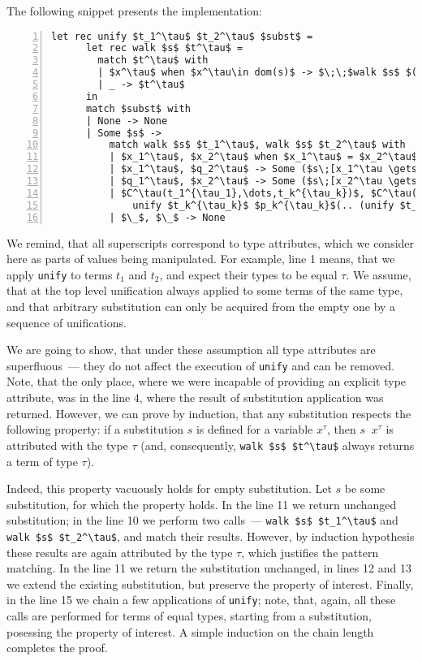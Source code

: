 The following snippet presents the implementation:

\begin{lstlisting}[mathescape=true,numbers=left,numberstyle=\small,stepnumber=1,numbersep=-5pt]
    let rec unify $t_1^\tau$ $t_2^\tau$ $subst$ = 
      let rec walk $s$ $t^\tau$ = 
        match $t^\tau$ with
        | $x^\tau$ when $x^\tau\in dom(s)$ -> $\;\;$walk $s$ $(s\;\;x^\tau)$
        | _ -> $t^\tau$
      in
      match $subst$ with
      | None -> None
      | Some $s$ ->
          match walk $s$ $t_1^\tau$, walk $s$ $t_2^\tau$ with
          | $x_1^\tau$, $x_2^\tau$ when $x_1^\tau$ = $x_2^\tau$ -> $subst$
          | $x_1^\tau$, $q_2^\tau$ -> Some ($s\;[x_1^\tau \gets q_2^\tau]$)
          | $q_1^\tau$, $x_2^\tau$ -> Some ($s\;[x_2^\tau \gets q_1^\tau]$)
          | $C^\tau(t_1^{\tau_1},\dots,t_k^{\tau_k})$, $C^\tau(p_1^{\tau_1},\dots,p_k^{\tau_k})$ -> 
              unify $t_k^{\tau_k}$ $p_k^{\tau_k}$(.. (unify $t_1^{\tau_1}$ $p_1^{\tau_1}$ $subst$)$..$)
          | $\_$, $\_$ -> None
\end{lstlisting}

We remind, that all superscripts correspond to type attributes, which we consider here as 
parts of values being manipulated. For example, line 1 means, that we apply \lstinline{unify}
to terms $t_1$ and $t_2$, and expect their types to be equal $\tau$. We assume, that 
at the top level unification always applied to some terms of the same type, and that arbitrary
substitution can only be acquired from the empty one by a sequence of unifications.

We are going to show, that under these assumption all type attributes are superfluous~--- they
do not affect the execution of \lstinline{unify} and can be removed. Note, that the only place, where we
were incapable of providing an explicit type attribute, was in the line 4, where the result of
substitution application was returned. However, we can prove by induction, that any substitution 
respects the following property: if a substitution $s$ is defined for a variable $x^\tau$,
then $s\;\;x^\tau$ is attributed with the type $\tau$ (and, consequently, \lstinline{walk $s$ $t^\tau$} always
returns a term of type $\tau$).

Indeed, this property vacuously holds for empty substitution. Let $s$ be some substitution, for which the
property holds. In the line 11 we return unchanged substitution; in the line 10 we perform two calls~--- 
\lstinline{walk $s$ $t_1^\tau$} and \lstinline{walk $s$ $t_2^\tau$}, and match their results. However, 
by induction hypothesis these results are again attributed by the type $\tau$, which justifies the
pattern matching. In the line 11 we return the substitution unchanged, in lines 12 and 13 we extend the
existing substitution, but preserve the property of interest. Finally, in the line 15 we chain a few
applications of \lstinline{unify}; note, that, again, all these calls are performed for terms of equal 
types, starting from a substitution, posessing the property of interest. A simple induction on the
chain length completes the proof.

